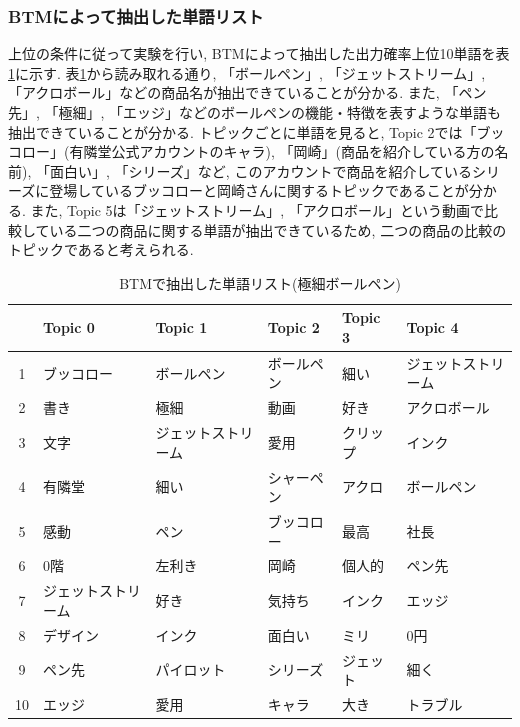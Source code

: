 \documentclass{ltjarticle}
\begin{document}
\subsubsection{BTMによって抽出した単語リスト}
上位の条件に従って実験を行い, BTMによって抽出した出力確率上位10単語を表\ref{table:ボールペン単語結果}に示す. 
表\ref{table:ボールペン単語結果}から読み取れる通り, 「ボールペン」, 「ジェットストリーム」, 
「アクロボール」などの商品名が抽出できていることが分かる. 
また, 「ペン先」, 「極細」, 「エッジ」などのボールペンの機能・特徴を表すような単語も抽出できていることが分かる. 
トピックごとに単語を見ると, Topic 2では「ブッコロー」(有隣堂公式アカウントのキャラ), 「岡崎」(商品を紹介している方の名前), 
「面白い」, 「シリーズ」など, このアカウントで商品を紹介しているシリーズに登場しているブッコローと岡崎さんに関するトピックであることが分かる. 
また, Topic 5は「ジェットストリーム」, 「アクロボール」という動画で比較している二つの商品に関する単語が抽出できているため, 
二つの商品の比較のトピックであると考えられる. 
\newpage
\begin{table}[h]
    \caption{BTMで抽出した単語リスト(極細ボールペン)}
    \vspace{5truept}

    \centering
    \begin{tabular}{|c|>{\centering}p{6em}|>{\centering}p{6em}|>{\centering}p{6em}|>{\centering}p{6em}|>{\centering\arraybackslash}p{6em}|}
        \hline
        & Topic 0 & Topic 1 & Topic 2 & Topic 3 & Topic 4\\
        \hline\hline
        1 & ブッコロー & ボールペン & ボールペン & 細い & ジェットストリーム\\
        \hline
        2 & 書き & 極細 & 動画 & 好き & アクロボール\\
        \hline
        3 & 文字 & ジェットストリーム & 愛用 & クリップ & インク\\
        \hline
        4 & 有隣堂 & 細い & シャーペン & アクロ & ボールペン\\
        \hline
        5 & 感動 & ペン & ブッコロー & 最高 & 社長\\
        \hline
        6 & 0階 & 左利き & 岡崎 & 個人的 & ペン先\\
        \hline
        7 & ジェットストリーム & 好き & 気持ち & インク & エッジ\\
        \hline
        8 & デザイン & インク & 面白い & ミリ & 0円\\
        \hline
        9 & ペン先 & パイロット & シリーズ & ジェット & 細く\\
        \hline
        10 & エッジ & 愛用 & キャラ & 大き & トラブル\\
        \hline
    \end{tabular}
    \label{table:ボールペン単語結果}
\end{table}
\vspace{10truept}
\end{document}
